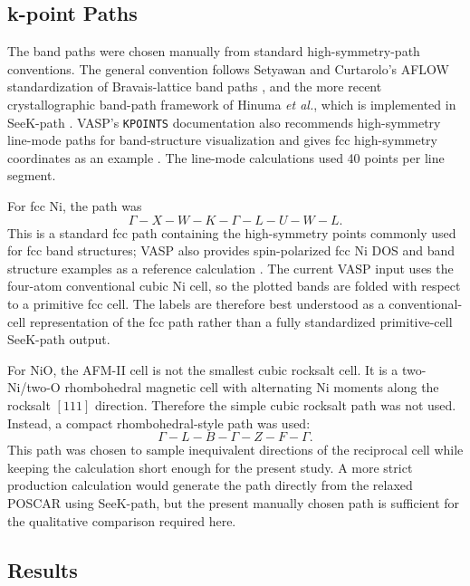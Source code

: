 \subsection{k-point Paths}

The band paths were chosen manually from standard high-symmetry-path
conventions.  The general convention follows Setyawan and Curtarolo's AFLOW
standardization of Bravais-lattice band paths \cite{setyawan-curtarolo}, and
the more recent crystallographic band-path framework of Hinuma \emph{et al.},
which is implemented in SeeK-path \cite{hinuma-seekpath}.  VASP's
\texttt{KPOINTS} documentation also recommends high-symmetry line-mode paths
for band-structure visualization and gives fcc high-symmetry coordinates as an
example \cite{vasp-kpoints}.  The line-mode calculations used 40 points per
line segment.

For fcc Ni, the path was
\[
  \Gamma - X - W - K - \Gamma - L - U - W - L.
\]
This is a standard fcc path containing the high-symmetry points commonly used
for fcc band structures; VASP also provides spin-polarized fcc Ni DOS and band
structure examples as a reference calculation \cite{vasp-fcc-ni}.  The current
VASP input uses the four-atom conventional cubic Ni cell, so the plotted bands
are folded with respect to a primitive fcc cell.  The labels are therefore best
understood as a conventional-cell representation of the fcc path rather than a
fully standardized primitive-cell SeeK-path output.

For NiO, the AFM-II cell is not the smallest cubic rocksalt cell.  It is a
two-Ni/two-O rhombohedral magnetic cell with alternating Ni moments along the
rocksalt \([111]\) direction.  Therefore the simple cubic rocksalt path was not
used.  Instead, a compact rhombohedral-style path was used:
\[
  \Gamma - L - B - \Gamma - Z - F - \Gamma.
\]
This path was chosen to sample inequivalent directions of the reciprocal cell
while keeping the calculation short enough for the present study.  A more
strict production calculation would generate the path directly from the relaxed
POSCAR using SeeK-path, but the present manually chosen path is sufficient for
the qualitative comparison required here.

\subsection{Results}

